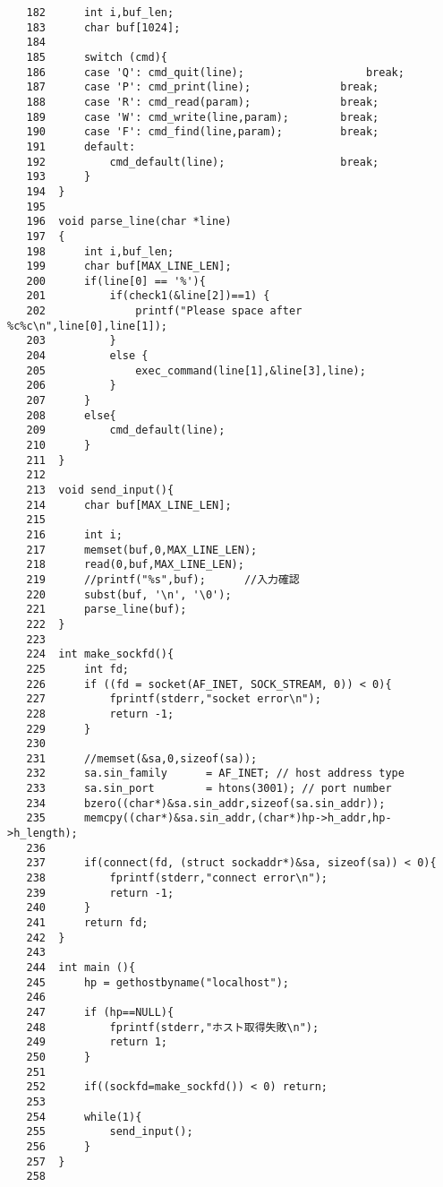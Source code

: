 \documentclass{jarticle}[11pt]
\begin{document}
\begin{verbatim}
   182	    int i,buf_len;
   183	    char buf[1024];
   184	
   185	    switch (cmd){
   186	    case 'Q': cmd_quit(line);                   break;
   187	    case 'P': cmd_print(line);              break;
   188	    case 'R': cmd_read(param);              break;
   189	    case 'W': cmd_write(line,param);        break;
   190	    case 'F': cmd_find(line,param);         break;
   191	    default:
   192	        cmd_default(line);                  break;
   193	    }
   194	}
   195	
   196	void parse_line(char *line)
   197	{
   198	    int i,buf_len;
   199	    char buf[MAX_LINE_LEN];
   200	    if(line[0] == '%'){
   201	        if(check1(&line[2])==1) {
   202	            printf("Please space after %c%c\n",line[0],line[1]);
   203	        }
   204	        else {
   205	            exec_command(line[1],&line[3],line);
   206	        }
   207	    }
   208	    else{
   209	        cmd_default(line);
   210	    }
   211	}
   212	
   213	void send_input(){
   214	    char buf[MAX_LINE_LEN];
   215	
   216	    int i;
   217	    memset(buf,0,MAX_LINE_LEN);
   218	    read(0,buf,MAX_LINE_LEN);
   219	    //printf("%s",buf);      //入力確認
   220	    subst(buf, '\n', '\0');
   221	    parse_line(buf);
   222	}
   223	
   224	int make_sockfd(){
   225	    int fd;
   226	    if ((fd = socket(AF_INET, SOCK_STREAM, 0)) < 0){
   227	        fprintf(stderr,"socket error\n");
   228	        return -1;
   229	    }
   230	
   231	    //memset(&sa,0,sizeof(sa));
   232	    sa.sin_family      = AF_INET; // host address type
   233	    sa.sin_port        = htons(3001); // port number
   234	    bzero((char*)&sa.sin_addr,sizeof(sa.sin_addr));
   235	    memcpy((char*)&sa.sin_addr,(char*)hp->h_addr,hp->h_length);
   236	    
   237	    if(connect(fd, (struct sockaddr*)&sa, sizeof(sa)) < 0){
   238	        fprintf(stderr,"connect error\n");
   239	        return -1;
   240	    }
   241	    return fd; 
   242	}
   243	
   244	int main (){
   245	    hp = gethostbyname("localhost");
   246	
   247	    if (hp==NULL){
   248	        fprintf(stderr,"ホスト取得失敗\n");
   249	        return 1;
   250	    }
   251	
   252	    if((sockfd=make_sockfd()) < 0) return;
   253	           
   254	    while(1){
   255	        send_input();
   256	    }
   257	}
   258	
\end{verbatim}
\end{document}
